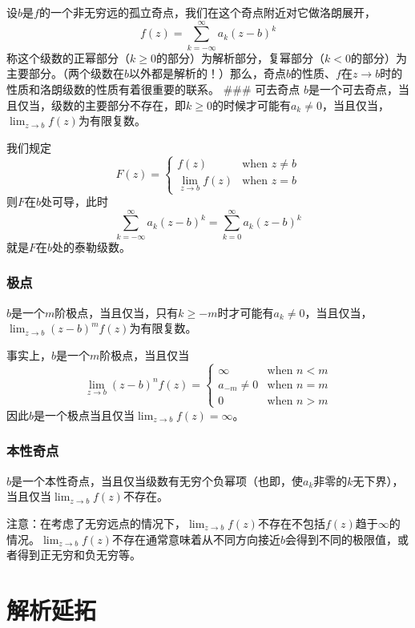 \documentclass[UTF8]{ctexart}
\begin{document}
设$b$是$f$的一个非无穷远的孤立奇点，我们在这个奇点附近对它做洛朗展开，
\[
f(z) = \sum_{k=-\infty}^\infty a_k (z - b)^k
\]
称这个级数的正幂部分（$k\geq 0$的部分）为解析部分，复幂部分（$k<0$的部分）为主要部分。（两个级数在$b$以外都是解析的！）那么，奇点$b$的性质、$f$在$z\rightarrow b$时的性质和洛朗级数的性质有着很重要的联系。
\#\#\# 可去奇点
$b$是一个可去奇点，当且仅当，级数的主要部分不存在，即$k \geq 0$的时候才可能有$a_k \neq 0$，当且仅当，$\lim_{z\rightarrow b} f(z)$为有限复数。

我们规定 \[
F(z) =
\begin{cases}
    f(z) & \text{when $z \neq b$} \\
    \lim_{z\rightarrow b} f(z) & \text{when $z=b$}
\end{cases}
\] 则$F$在$b$处可导，此时 \[
\sum_{k=-\infty}^\infty a_k (z - b)^k = \sum_{k=0}^\infty a_k (z - b)^k
\] 就是$F$在$b$处的泰勒级数。

\hypertarget{ux6781ux70b9}{%
\subsubsection{极点}\label{ux6781ux70b9}}

$b$是一个$m$阶极点，当且仅当，只有$k \geq -m$时才可能有$a_k \neq 0$，当且仅当，$\lim_{z\rightarrow b}(z-b)^m f(z)$为有限复数。

事实上，$b$是一个$m$阶极点，当且仅当 \[
\lim_{z\rightarrow b} (z-b)^n f(z) = 
\begin{cases}
    \infty & \text{when $n<m$} \\
    a_{-m} \neq 0 & \text{when $n=m$} \\
    0 & \text{when $n>m$}
\end{cases}
\] 因此$b$是一个极点当且仅当$\lim_{z\rightarrow b}f(z) = \infty$。

\hypertarget{ux672cux6027ux5947ux70b9}{%
\subsubsection{本性奇点}\label{ux672cux6027ux5947ux70b9}}

$b$是一个本性奇点，当且仅当级数有无穷个负幂项（也即，使$a_k$非零的$k$无下界），当且仅当$\lim_{z\rightarrow b} f(z)$不存在。

注意：在考虑了无穷远点的情况下，$\lim_{z\rightarrow b} f(z)$不存在不包括$f(z)$趋于$\infty$的情况。$\lim_{z\rightarrow b} f(z)$不存在通常意味着从不同方向接近$b$会得到不同的极限值，或者得到正无穷和负无穷等。

\hypertarget{ux89e3ux6790ux5ef6ux62d3}{%
\section{解析延拓}\label{ux89e3ux6790ux5ef6ux62d3}}
\end{document}
